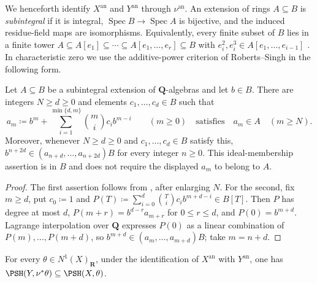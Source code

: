 \documentclass[11pt,a4paper]{article}
\newcommand{\an}{\mathrm{an}}          %
\begin{document}
We henceforth identify $X^{\an}$ and $Y^{\an}$ through $\nu^{\an}$. An extension of rings $A\subseteq B$ is \emph{subintegral} if it is integral, $\operatorname{Spec}B\to\operatorname{Spec}A$ is bijective, and the induced residue-field maps are isomorphisms. Equivalently, every finite subset of $B$ lies in a finite tower $A\subseteq A[e_1]\subseteq\cdots\subseteq A[e_1,\ldots,e_r]\subseteq B$ with $e_i^2,e_i^3\in A[e_1,\ldots,e_{i-1}]$ \cite[\href{https://stacks.math.columbia.edu/tag/0CND}{Tag 0CND}]{Stacks}. In characteristic zero we use the additive-power criterion of Roberts--Singh in the following form.

\begin{lemma}\label{lem:normalization-local-sandwich}
Let $A\subseteq B$ be a subintegral extension of $\mathbf Q$-algebras and let $b\in B$. There are integers $N\geq d\geq 0$ and elements $c_1,\ldots,c_d\in B$ such that
\[
 a_m\coloneqq b^m+\sum_{i=1}^{\min\{d,m\}}\binom mi c_i b^{m-i}\qquad(m\geq0)
 \quad\text{satisfies}\quad a_m\in A\quad(m\geq N).
\]
Moreover, whenever $N\geq d\geq0$ and $c_1,\ldots,c_d\in B$ satisfy this, $b^{n+2d}\in(a_{n+d},\ldots,a_{n+2d})B$ for every integer $n\geq0$. This ideal-membership assertion is in $B$ and does not require the displayed $a_m$ to belong to $A$.
\end{lemma}

\begin{proof}
The first assertion follows from \cite[Theorem~4.17, Proposition~4.2 and Corollary~4.3]{RobertsSingh}, after enlarging $N$. For the second, fix $m\geq d$, put $c_0\coloneqq1$ and $P(T)\coloneqq\sum_{i=0}^{d}\binom Ti c_i b^{m+d-i}\in B[T]$. Then $P$ has degree at most $d$, $P(m+r)=b^{d-r}a_{m+r}$ for $0\leq r\leq d$, and $P(0)=b^{m+d}$. Lagrange interpolation over $\mathbf Q$ expresses $P(0)$ as a linear combination of $P(m),\ldots,P(m+d)$, so $b^{m+d}\in(a_m,\ldots,a_{m+d})B$; take $m=n+d$.
\end{proof}

\begin{theorem}\label{thm:normalization-reflection}
For every $\theta\in N^1(X)_{\mathbf{R}}$, under the identification of $X^{\an}$ with $Y^{\an}$, one has $\PSH(Y,\nu^*\theta)\subseteq\PSH(X,\theta)$.
\end{theorem}
\end{document}
